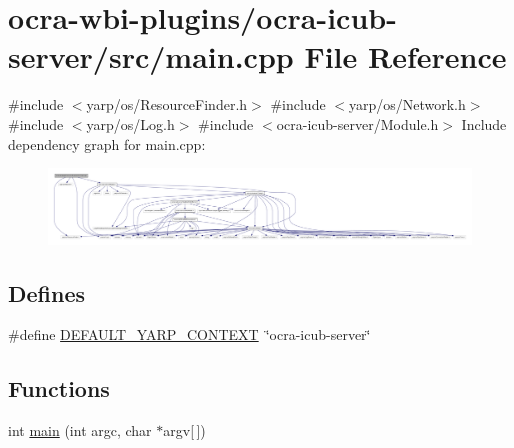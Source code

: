 \hypertarget{ocra-icub-server_2src_2main_8cpp}{\section{ocra-\/wbi-\/plugins/ocra-\/icub-\/server/src/main.cpp \-File \-Reference}
\label{ocra-icub-server_2src_2main_8cpp}
}
{\ttfamily \#include $<$yarp/os/\-Resource\-Finder.\-h$>$}\*
{\ttfamily \#include $<$yarp/os/\-Network.\-h$>$}\*
{\ttfamily \#include $<$yarp/os/\-Log.\-h$>$}\*
{\ttfamily \#include $<$ocra-\/icub-\/server/\-Module.\-h$>$}\*
\-Include dependency graph for main.\-cpp\-:\nopagebreak
\begin{figure}[H]
\begin{center}
\leavevmode
\includegraphics[width=350pt]{ocra-icub-server_2src_2main_8cpp__incl}
\end{center}
\end{figure}
\subsection*{\-Defines}
\begin{DoxyCompactItemize}
\item 
\#define \hyperlink{ocra-icub-server_2src_2main_8cpp_aacf7b13861a4ce37b8dec1979eb6450c}{\-D\-E\-F\-A\-U\-L\-T\-\_\-\-Y\-A\-R\-P\-\_\-\-C\-O\-N\-T\-E\-X\-T}~\char`\"{}ocra-\/icub-\/server\char`\"{}
\end{DoxyCompactItemize}
\subsection*{\-Functions}
\begin{DoxyCompactItemize}
\item 
int \hyperlink{ocra-icub-server_2src_2main_8cpp_a0ddf1224851353fc92bfbff6f499fa97}{main} (int argc, char $\ast$argv\mbox{[}$\,$\mbox{]})
\end{DoxyCompactItemize}



